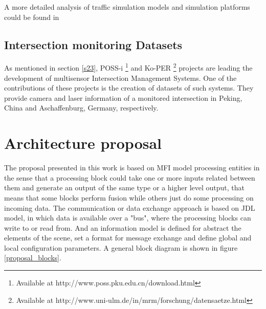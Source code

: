 
A more detailed analysis of traffic simulation models and simulation platforms could be found in \cite{AdamsBoxill2000, Barcelo2000, Kitamura2005, Lieberman1992}




\subsection{Intersection monitoring Datasets}

As mentioned in section \ref{s23}, POSS-i \footnote{Available at http://www.poss.pku.edu.cn/download.html} and Ko-PER \footnote{Available at http://www.uni-ulm.de/in/mrm/forschung/datensaetze.html} projects are leading the development of multisensor Intersection Management Systems. One of the contributions of these projects is the creation of datasets of such systems. They provide camera and laser information of a monitored intersection in Peking, China and Aschaffenburg, Germany, respectively.

%
%
%
%
%
%

\section{Architecture proposal}

The proposal presented in this work is based on MFI model processing entities in the sense that a processing block could take one or more inputs related between them and generate an output of the same type or a higher level output, that means that some blocks perform fusion while others just do some processing on incoming data. The communication or data exchange approach is based on JDL model, in which data is available over a "bus", where the processing blocks can write to or read from. And an information model is defined for abstract the elements of the scene, set a format for message exchange and define global and local configuration parameters. A general block diagram is shown in figure \ref{proposal_blocks}.

